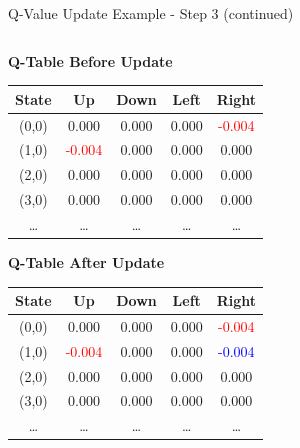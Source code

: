 \documentclass[aspectratio=169]{beamer}
\begin{document}
\begin{frame}{Q-Value Update Example - Step 3 (continued)}
    
    \begin{columns}
        \begin{column}{0.5\textwidth}
            \textbf{Q-Table Before Update}
            \small
            \begin{table}[h]
                \centering
                \begin{tabular}{|c|c|c|c|c|}
                    \hline
                    \textbf{State} & \textbf{Up} & \textbf{Down} & \textbf{Left} & \textbf{Right} \\
                    \hline
                    (0,0) & 0.000 & 0.000 & 0.000 & \textcolor{red}{-0.004} \\
                    (1,0) & \textcolor{red}{-0.004} & 0.000 & 0.000 & 0.000 \\
                    (2,0) & 0.000 & 0.000 & 0.000 & 0.000 \\
                    (3,0) & 0.000 & 0.000 & 0.000 & 0.000 \\
                    \dots & \dots & \dots & \dots & \dots \\
                    \hline
                \end{tabular}
            \end{table}
            
            \textbf{Q-Table After Update}
            \small
            \begin{table}[h]
                \centering
                \begin{tabular}{|c|c|c|c|c|}
                    \hline
                    \textbf{State} & \textbf{Up} & \textbf{Down} & \textbf{Left} & \textbf{Right} \\
                    \hline
                    (0,0) & 0.000 & 0.000 & 0.000 & \textcolor{red}{-0.004} \\
                    (1,0) & \textcolor{red}{-0.004} & 0.000 & 0.000 & \textcolor{blue}{-0.004} \\
                    (2,0) & 0.000 & 0.000 & 0.000 & 0.000 \\
                    (3,0) & 0.000 & 0.000 & 0.000 & 0.000 \\
                    \dots & \dots & \dots & \dots & \dots \\
                    \hline
                \end{tabular}
            \end{table}
        \end{column}
        

\end{columns}
\end{frame}
\end{document}
